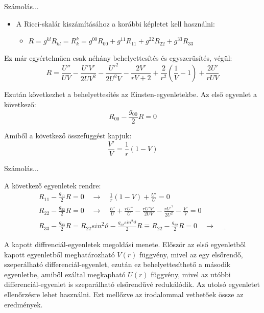\documentclass[10pt]{beamer}
\begin{document}
\begin{frame}[t]{Számolás...}
\begin{itemize}
\item A Ricci-skalár kiszámításához a korábbi képletet kell használni:
\begin{itemize}
\item $R = g^{kl}R_{kl} = R_{k}^{k} = g^{00}R_{00} + g^{11}R_{11} + g^{22}R_{22} + g^{33}R_{33}$
\end{itemize}
\end{itemize}
\par Ez már egyértelműen csak néhány behelyettesítés és egyszerüsítés, végül:
\begin{equation*}
R = \frac{U''}{UV} - \frac{U'V'}{2UV^{2}} - \frac{U'^{2}}{2U^{2}V} - \frac{2V'}{rV+{2}} + \frac{2}{r^{2}}(\frac{1}{V} - 1) + \frac{2U'}{rUV}
\end{equation*}
\par Ezután következhet a behelyettesítés az Einsten-egyenletekbe. Az első egyenlet a következő:
\begin{equation*}
R_{00} - \frac{g_{00}}{2}R = 0
\end{equation*}
\par Amiből a következő összefüggést kapjuk:
\begin{equation*}
\frac{V'}{V} = \frac{1}{r}(1 - V)
\end{equation*}
\end{frame}

\begin{frame}[t]{Számolás...}
\par A következő egyenletek rendre:
\begin{gather*}
R_{11} - \frac{g_{11}}{2} R = 0 \quad \rightarrow \quad \frac{1}{r}(1 - V) + \frac{U'}{U} = 0 \\
R_{22} - \frac{g_{22}}{2} R = 0 \quad \rightarrow \quad \frac{U'}{U} + \frac{rU''}{U} - \frac{rU'V'}{2UV} - \frac{rU'^{2}}{2U^{2}} - \frac{V'}{V} = 0 \\
R_{33} - \frac{g_{33}}{2} R = R_{22}sin^{2}\vartheta - \frac{g_{22}sin^{2}\vartheta}{2}R \equiv R_{22} - \frac{g_{22}}{2} R = 0 \quad \rightarrow \quad _{\cdots}
\end{gather*}
\par A kapott diffrenciál-egyenletek megoldási menete. Először az első egyenletből kapott egyenletből meghatározható $V(r)$ függvény,
mivel az egy elsőrendő, szeperálható differenciál-egyenlet, ezután ez behelyettesíthető a második egyenletbe, amiből ezáltal 
megkapható $U(r)$ függvény, mivel az utóbbi differenciál-egyenlet is szeparálható elsőrendűvé redukálódik. Az utolsó egyenletet ellenőrzésre
lehet használni. Ezt mellőzve az irodalommal vethetőek össze az eredmények.
\end{frame}
\end{document}
